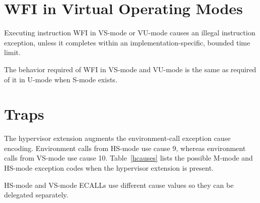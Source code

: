 \section{WFI in Virtual Operating Modes}

Executing instruction WFI in VS-mode or VU-mode causes an illegal instruction
exception, unless it completes within an implementation-specific, bounded time
limit.

\begin{commentary}
The behavior required of WFI in VS-mode and VU-mode is the same as required of
it in U-mode when S-mode exists.
\end{commentary}

\section{Traps}

The hypervisor extension augments the environment-call exception cause
encoding.  Environment calls from HS-mode use cause 9, whereas environment
calls from VS-mode use cause 10.  Table~\ref{hcauses} lists the
possible M-mode and HS-mode exception codes when the hypervisor extension is
present.

\begin{commentary}
HS-mode and VS-mode ECALLs use different cause values so they can be delegated
separately.
\end{commentary}

